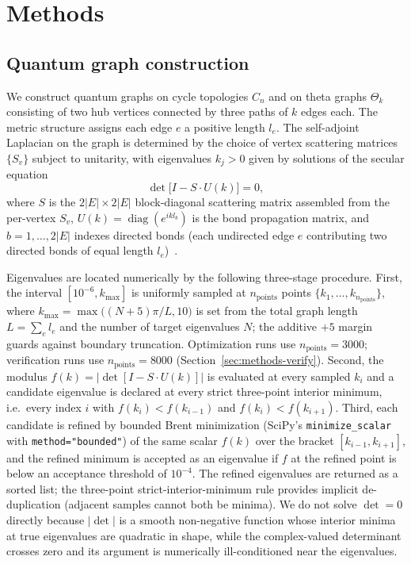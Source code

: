 \documentclass[cntp]{ipart}
\theoremstyle{plain}
\theoremstyle{remark}
\begin{document}
\section{Methods}
\label{sec:methods}

\subsection{Quantum graph construction}
\label{sec:methods-construction}

We construct quantum graphs on cycle topologies $C_n$ and on theta graphs $\Theta_k$ consisting of two hub vertices connected by three paths of $k$ edges each. The metric structure assigns each edge $e$ a positive length $l_e$. The self-adjoint Laplacian on the graph is determined by the choice of vertex scattering matrices $\{S_v\}$ subject to unitarity, with eigenvalues $k_j > 0$ given by solutions of the secular equation
\begin{equation}
    \det\bigl[I - S \cdot U(k)\bigr] = 0,
\end{equation}
where $S$ is the $2|E| \times 2|E|$ block-diagonal scattering matrix assembled from the per-vertex $S_v$, $U(k) = \operatorname{diag}(e^{i k l_b})$ is the bond propagation matrix, and $b = 1, \ldots, 2|E|$ indexes directed bonds (each undirected edge $e$ contributing two directed bonds of equal length $l_e$)~\cite{r3}.

Eigenvalues are located numerically by the following three-stage procedure. First, the interval $[10^{-6}, k_{\max}]$ is uniformly sampled at $n_{\mathrm{points}}$ points $\{k_1, \ldots, k_{n_{\mathrm{points}}}\}$, where $k_{\max} = \max\bigl((N + 5)\pi / L, 10\bigr)$ is set from the total graph length $L = \sum_e l_e$ and the number of target eigenvalues $N$; the additive $+5$ margin guards against boundary truncation. Optimization runs use $n_{\mathrm{points}} = 3000$; verification runs use $n_{\mathrm{points}} = 8000$ (Section~\ref{sec:methods-verify}). Second, the modulus $f(k) = |\det[I - S \cdot U(k)]|$ is evaluated at every sampled $k_i$ and a candidate eigenvalue is declared at every strict three-point interior minimum, i.e.\ every index $i$ with $f(k_i) < f(k_{i-1})$ and $f(k_i) < f(k_{i+1})$. Third, each candidate is refined by bounded Brent minimization (SciPy's \texttt{minimize\_scalar} with \texttt{method="bounded"}) of the same scalar $f(k)$ over the bracket $[k_{i-1}, k_{i+1}]$, and the refined minimum is accepted as an eigenvalue if $f$ at the refined point is below an acceptance threshold of $10^{-4}$. The refined eigenvalues are returned as a sorted list; the three-point strict-interior-minimum rule provides implicit de-duplication (adjacent samples cannot both be minima). We do not solve $\det = 0$ directly because $|{\det}|$ is a smooth non-negative function whose interior minima at true eigenvalues are quadratic in shape, while the complex-valued determinant crosses zero and its argument is numerically ill-conditioned near the eigenvalues.
\end{document}
